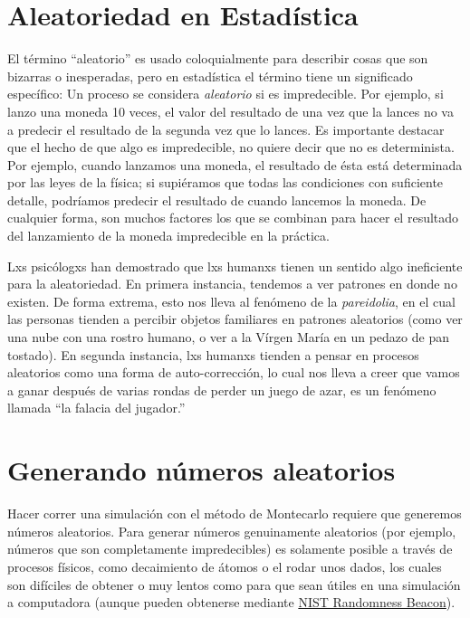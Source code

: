 \documentclass[
  12pt,
]{book}
\begin{document}
\hypertarget{aleatoriedad-en-estaduxedstica}{%
\section{Aleatoriedad en Estadística}\label{aleatoriedad-en-estaduxedstica}}

El término ``aleatorio'' es usado coloquialmente para describir cosas que son bizarras o inesperadas, pero en estadística el término tiene un significado específico: Un proceso se considera \emph{aleatorio} si es impredecible. Por ejemplo, si lanzo una moneda 10 veces, el valor del resultado de una vez que la lances no va a predecir el resultado de la segunda vez que lo lances. Es importante destacar que el hecho de que algo es impredecible, no quiere decir que no es determinista. Por ejemplo, cuando lanzamos una moneda, el resultado de ésta está determinada por las leyes de la física; si supiéramos que todas las condiciones con suficiente detalle, podríamos predecir el resultado de cuando lancemos la moneda. De cualquier forma, son muchos factores los que se combinan para hacer el resultado del lanzamiento de la moneda impredecible en la práctica.

Lxs psicólogxs han demostrado que lxs humanxs tienen un sentido algo ineficiente para la aleatoriedad. En primera instancia, tendemos a ver patrones en donde no existen. De forma extrema, esto nos lleva al fenómeno de la \emph{pareidolia}, en el cual las personas tienden a percibir objetos familiares en patrones aleatorios (como ver una nube con una rostro humano, o ver a la Vírgen María en un pedazo de pan tostado). En segunda instancia, lxs humanxs tienden a pensar en procesos aleatorios como una forma de auto-corrección, lo cual nos lleva a creer que vamos a ganar después de varias rondas de perder un juego de azar, es un fenómeno llamada ``la falacia del jugador.''

\hypertarget{generando-nuxfameros-aleatorios}{%
\section{Generando números aleatorios}\label{generando-nuxfameros-aleatorios}}

Hacer correr una simulación con el método de Montecarlo requiere que generemos números aleatorios. Para generar números genuinamente aleatorios (por ejemplo, números que son completamente impredecibles) es solamente posible a través de procesos físicos, como decaimiento de átomos o el rodar unos dados, los cuales son difíciles de obtener o muy lentos como para que sean útiles en una simulación a computadora (aunque pueden obtenerse mediante \href{https://www.nist.gov/programs-projects/nist-randomness-beacon\%5D}{NIST Randomness Beacon}).
\end{document}
